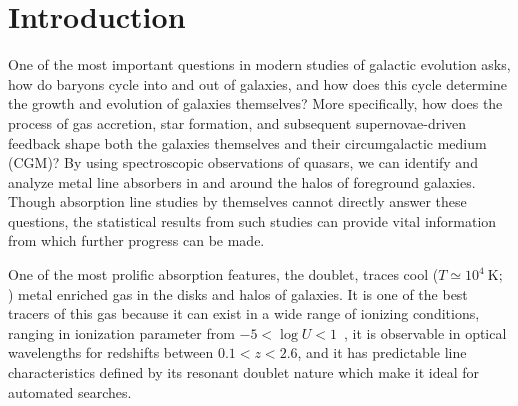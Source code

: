 \documentclass[iop,apj,numberedappendix,appendixfloats,twocolappendix]{emulateapj}
\begin{document}


\section{Introduction}
\label{sec:intro}

One of the most important questions in modern studies of galactic evolution asks, how do baryons cycle into and out of galaxies, and how does this cycle determine the growth and evolution of galaxies themselves? More specifically, how does the process of gas accretion, star formation, and subsequent supernovae-driven feedback shape both the galaxies themselves and their circumgalactic medium (CGM)? By using spectroscopic observations of quasars, we can identify and analyze metal line absorbers in and around the halos of foreground galaxies. Though absorption line studies by themselves cannot directly answer these questions, the statistical results from such studies can provide vital information from which further progress can be made.

One of the most prolific absorption features, the {\MgIIdblt} doublet, traces cool ($T \simeq 10^4~\mathrm{K}$; \cite{Churchill2003}) metal enriched gas in the disks and halos of galaxies. It is one of the best tracers of this gas because it can exist in a wide range of ionizing conditions, ranging in ionization parameter from $-5 < \log U < 1$~\citep{Churchill1999}, it is observable in optical wavelengths for redshifts between $0.1 < z < 2.6$, and it has predictable line characteristics defined by its resonant doublet nature which make it ideal for automated searches. 
\end{document}
